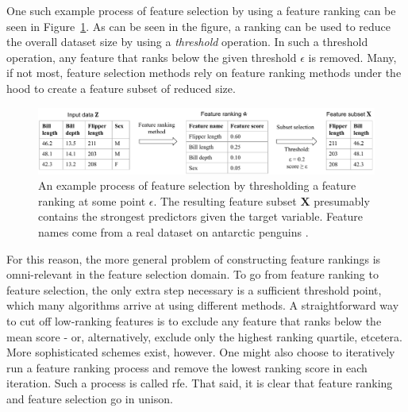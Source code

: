 \documentclass[../main.tex]{subfiles}
\begin{document}
One such example process of feature selection by using a feature ranking can be seen in Figure~\ref{fig:schematic-feature-selection}. As can be seen in the figure, a ranking can be used to reduce the overall dataset size by using a \textit{threshold} operation. In such a threshold operation, any feature that ranks below the given threshold $\epsilon$ is removed. Many, if not most, feature selection methods rely on feature ranking methods under the hood to create a feature subset of reduced size.

\begin{figure}[h]
    \centering
    \includegraphics[width=\linewidth]{report/images/schematic-feature-selection.pdf}
    \caption{An example process of feature selection by thresholding a feature ranking at some point $\epsilon$. The resulting feature subset $\mathbf{X}$ presumably contains the strongest predictors given the target variable. Feature names come from a real dataset on antarctic penguins \citep{horst_palmerpenguins_2020}.}
    \label{fig:schematic-feature-selection}
\end{figure}

For this reason, the more general problem of constructing feature rankings is omni-relevant in the feature selection domain. To go from feature ranking to feature selection, the only extra step necessary is a sufficient threshold point, which many algorithms arrive at using different methods. A straightforward way to cut off low-ranking features is to exclude any feature that ranks below the mean score - or, alternatively, exclude only the highest ranking quartile, etcetera. More sophisticated schemes exist, however. One might also choose to iteratively run a feature ranking process and remove the lowest ranking score in each iteration. Such a process is called \gls{rfe}. That said, it is clear that feature ranking and feature selection go in unison.





\end{document}
